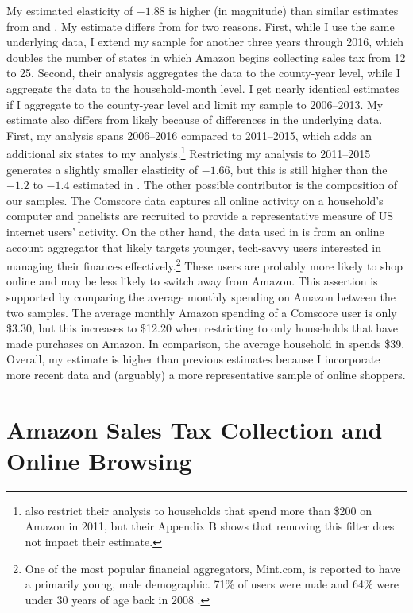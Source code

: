 \documentclass[AEJ,reviewmode]{AEA}
\begin{document}
My estimated elasticity of $-1.88$ is higher (in magnitude) than similar estimates from \citet{baughBenDavidPark2016} and \citet{houdeNewberrySeim2016}. My estimate differs from \citet{houdeNewberrySeim2016} for two reasons. First, while I use the same underlying data, I extend my sample for another three years through 2016, which doubles the number of states in which Amazon begins collecting sales tax from 12 to 25. Second, their analysis aggregates the data to the county-year level, while I aggregate the data to the household-month level. I get nearly identical estimates if I aggregate to the county-year level and limit my sample to 2006--2013. My estimate also differs from \citet{baughBenDavidPark2016} likely because of differences in the underlying data. First, my analysis spans 2006--2016 compared to 2011--2015, which adds an additional six states to my analysis.\footnote{\citet{baughBenDavidPark2016} also restrict their analysis to households that spend more than \$200 on Amazon in 2011, but their Appendix B shows that removing this filter does not impact their estimate.} Restricting my analysis to 2011--2015 generates a slightly smaller elasticity of $-1.66$, but this is still higher than the $-1.2$ to $-1.4$ estimated in \citet{baughBenDavidPark2016}. The other possible contributor is the composition of our samples. The Comscore data captures all online activity on a household's computer and panelists are recruited to provide a representative measure of US internet users' activity. On the other hand, the data used in \citet{baughBenDavidPark2016} is from an online account aggregator that likely targets younger, tech-savvy users interested in managing their finances effectively.\footnote{One of the most popular financial aggregators, Mint.com, is reported to have a primarily young, male demographic. 71\% of users were male and 64\% were under 30 years of age back in 2008 \citep{perez2008}.} These users are probably more likely to shop online and may be less likely to switch away from Amazon. This assertion is supported by comparing the average monthly spending on Amazon between the two samples. The average monthly Amazon spending of a Comscore user is only \$3.30, but this increases to \$12.20 when restricting to only households that have made purchases on Amazon. In comparison, the average household in \citet{baughBenDavidPark2016} spends \$39. Overall, my estimate is higher than previous estimates because I incorporate more recent data and (arguably) a more representative sample of online shoppers.

\section{Amazon Sales Tax Collection and Online Browsing}
\label{sec:browse}
\end{document}
